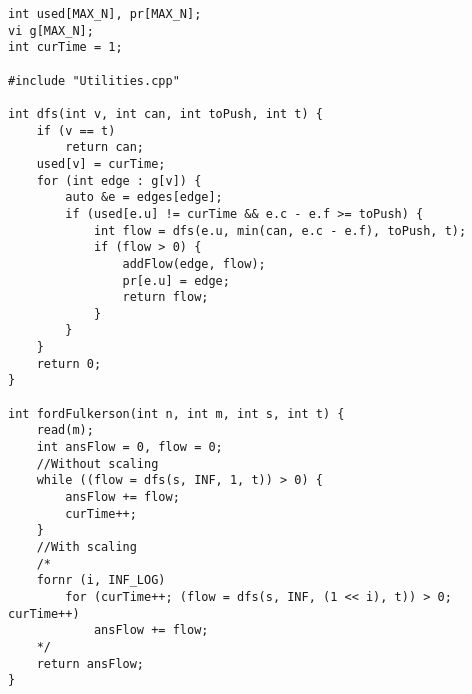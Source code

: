 \begin{verbatim}
int used[MAX_N], pr[MAX_N];
vi g[MAX_N];
int curTime = 1;

#include "Utilities.cpp"

int dfs(int v, int can, int toPush, int t) {
	if (v == t)
		return can;
	used[v] = curTime;
	for (int edge : g[v]) {
		auto &e = edges[edge];
		if (used[e.u] != curTime && e.c - e.f >= toPush) {
			int flow = dfs(e.u, min(can, e.c - e.f), toPush, t);
			if (flow > 0) {
				addFlow(edge, flow);
				pr[e.u] = edge;
				return flow;
			}
		}
	}
	return 0;
}

int fordFulkerson(int n, int m, int s, int t) {
	read(m);
	int ansFlow = 0, flow = 0;
	//Without scaling
	while ((flow = dfs(s, INF, 1, t)) > 0) {
		ansFlow += flow;
		curTime++;
	}
	//With scaling
	/*
	fornr (i, INF_LOG) 
		for (curTime++; (flow = dfs(s, INF, (1 << i), t)) > 0; curTime++)
			ansFlow += flow;
	*/
	return ansFlow;
}
\end{verbatim}

